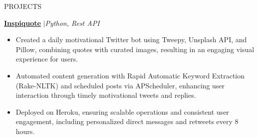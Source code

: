 \documentclass{resume} %
\begin{document}
\begin{rSection}{PROJECTS}


\href{https://github.com/RutvikJ77/Inspiquote}{\textbf{\underline{Inspiquote}}} $|$\textit{Python, Rest API}
\begin{itemize}
  \item Created a daily motivational Twitter bot using Tweepy, Unsplash API, and Pillow, combining quotes with curated images, resulting in an engaging visual experience for users.
  \item Automated content generation with Rapid Automatic Keyword Extraction (Rake-NLTK) and scheduled posts via APScheduler, enhancing user interaction through timely motivational tweets and replies.
  \item Deployed on Heroku, ensuring scalable operations and consistent user engagement, including personalized direct messages and retweets every 8 hours.
\end{itemize}


\end{rSection}
\end{document}
